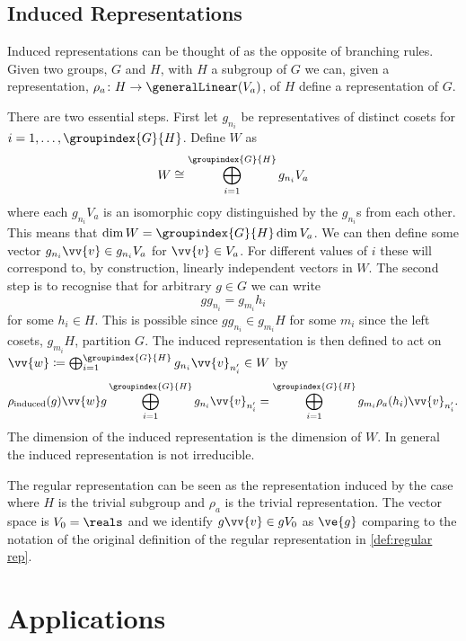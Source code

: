\subsection{Induced Representations}
Induced representations can be thought of as the opposite of branching
rules.
Given two groups, \(G\) and \(H\), with \(H\) a subgroup of \(G\) we can,
given a representation, \(\rho_a \colon H \to \generalLinear(V_a)\), of \(H\)
define a representation of \(G\).

There are two essential steps.
First let \(g_{n_i}\) be representatives of distinct cosets for \(i = 1,
\dotsc, \groupindex{G}{H}\).
Define \(W\) as
\begin{equation}
    W \isomorphic \bigoplus_{i = 1}^{\groupindex{G}{H}} g_{n_i} V_a
\end{equation}
where each \(g_{n_i}V_a\) is an isomorphic copy distinguished by the
\(g_{n_i}\)s from each other.
This means that \(\dim W = \groupindex{G}{H}\dim V_a\).
We can then define some vector \(g_{n_i}\vv{v} \in g_{n_i}V_a\) for \(\vv{v}
\in V_a\).
For different values of \(i\) these will correspond to, by construction,
linearly independent vectors in \(W\).
The second step is to recognise that for arbitrary \(g \in G\) we can write
\begin{equation}
    g g_{n_i} = g_{m_i} h_i
\end{equation}
for some \(h_i \in H\).
This is possible since \(gg_{n_i} \in g_{m_i}H\) for some \(m_i\) since the
left cosets, \(g_{m_i}H\), partition \(G\).
The induced representation is then defined to act on \(\vv{w} \coloneqq
\bigoplus_{i = 1}^{\groupindex{G}{H}} g_{n_i}\vv{v}_{n'_i} \in W\) by
\begin{equation}
    \rho_{\mathrm{induced}}(g) \vv{w} g \bigoplus_{i =
        1}^{\groupindex{G}{H}} g_{n_i}\vv{v}_{n'_i} = \bigoplus_{i =
        1}^{\groupindex{G}{H}} g_{m_i} \rho_a(h_i) \vv{v}_{n'_i}.
\end{equation}
The dimension of the induced representation is the dimension of \(W\).
In general the induced representation is not irreducible.

The regular representation can be seen as the representation induced by the
case where \(H\) is the trivial subgroup and \(\rho_a\) is the trivial
representation.
The vector space is \(V_0 = \reals\) and we identify \(g\vv{v} \in gV_0\) as
\(\ve{g}\) comparing to the notation of the original definition of the regular
representation in \cref{def:regular rep}.

\section{Applications}
